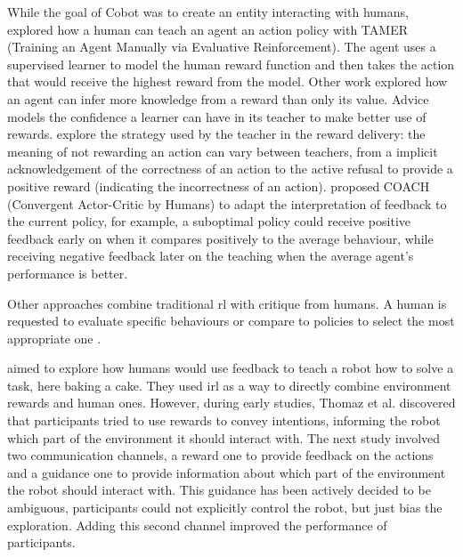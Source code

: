 While the goal of Cobot was to create an entity interacting with humans, \cite{knox2009interactively} explored how a human can teach an agent an action policy with TAMER (Training an Agent Manually via Evaluative Reinforcement). The agent uses a supervised learner to model the human reward function and then takes the action that would receive the highest reward from the model. Other work explored how an agent can infer more knowledge from a reward than only its value. Advice \citep{griffith2013policy} models the confidence a learner can have in its teacher to make better use of rewards. \cite{loftin2016learning} explore the strategy used by the teacher in the reward delivery: the meaning of not rewarding an action can vary between teachers, from a implicit acknowledgement of the correctness of an action to the active refusal to provide a positive reward (indicating the incorrectness of an action). \cite{macglashan2017interactive} proposed COACH (Convergent Actor-Critic by Humans) to adapt the interpretation of feedback to the current policy, for example, a suboptimal policy could receive positive feedback early on when it compares positively to the average behaviour, while receiving negative feedback later on the teaching when the average agent's performance is better.

Other approaches combine traditional \gls{rl} with critique from humans. A human is requested to evaluate specific behaviours \citep{judah2010reinforcement} or compare to policies to select the most appropriate one \citep{christiano2017deep}. 


\cite{thomaz2008teachable} aimed to explore how humans would use feedback to teach a robot how to solve a task,  here baking a cake. They used \acrfull{irl} as a way to directly combine environment rewards and human ones. However, during early studies, Thomaz et al. discovered that participants tried to use rewards to convey intentions, informing the robot which part of the environment it should interact with. The next study involved two communication channels, a reward one to provide feedback on the actions and a guidance one to provide information about which part of the environment the robot should interact with. This guidance has been actively decided to be ambiguous, participants could not explicitly control the robot, but just bias the exploration. Adding this second channel improved the performance of participants.


